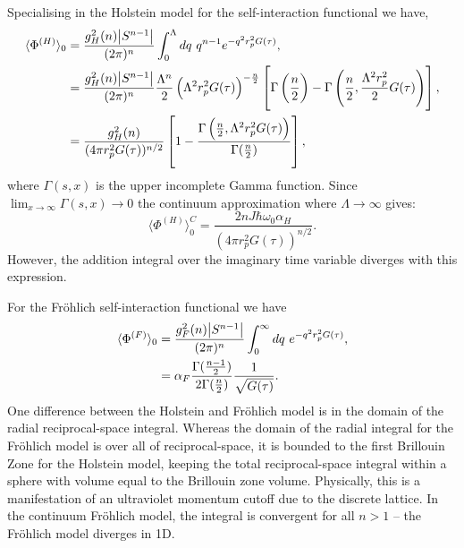 Specialising in the Holstein model for the self-interaction functional we have,
\begin{equation}
    \begin{aligned}
        \langle \Phi^{(H)} \rangle_0 &= \frac{g^2_H(n) \abs{S^{n-1}}}{(2\pi)^n} \int_0^{\Lambda} dq\ q^{n-1} e^{-q^2 r_p^2 G(\tau)} , \\
        &= \frac{g^2_H(n) \abs{S^{n-1}}}{(2\pi)^n} \frac{\Lambda^n}{2} \left(\Lambda^2 r_p^2 G(\tau) \right)^{-\frac{n}{2}} \left[ \Gamma\left(\frac{n}{2}\right) - \Gamma\left(\frac{n}{2}, \frac{\Lambda^2 r_p^2}{2} G(\tau) \right) \right], \\
        &= \frac{g_H^2(n)}{(4\pi r_p^2 G(\tau))^{n/2}} \left[1 - \frac{\Gamma\left(\frac{n}{2}, \Lambda^2 r_p^2 G(\tau) \right)}{\Gamma(\frac{n}{2})} \right], 
    \end{aligned}
\end{equation}
where $\Gamma(s, x)$ is the upper incomplete Gamma function. Since $\lim_{x\to\infty} \Gamma(s, x) \to 0$ the continuum approximation where $\Lambda \to \infty$ gives:
\begin{equation}
    \langle \Phi^{(H)} \rangle_0^C = \frac{2 n J \hbar \omega_0 \alpha_H}{(4\pi r^2_p G(\tau))^{n/2}}.
\end{equation}
However, the addition integral over the imaginary time variable diverges with this expression.

For the Fr\"ohlich self-interaction functional we have
\begin{equation}
    \begin{aligned}
        \langle\Phi^{(F)}\rangle_0 &= \frac{g^2_F(n) \abs{S^{n-1}}}{(2\pi)^n} \int_0^{\infty} dq\ e^{-q^2 r_p^2 G(\tau)} , \\
        &= \alpha_F \frac{\Gamma(\frac{n-1}{2})}{2 \Gamma(\frac{n}{2})} \frac{1}{\sqrt{G(\tau)}}.
    \end{aligned}
\end{equation}
One difference between the Holstein and Fr\"ohlich model is in the domain of the radial reciprocal-space integral. Whereas the domain of the radial integral for the Fr\"ohlich model is over all of reciprocal-space, it is bounded to the first Brillouin Zone for the Holstein model, keeping the total reciprocal-space integral within a sphere with volume equal to the Brillouin zone volume. Physically, this is a manifestation of an ultraviolet momentum cutoff due to the discrete lattice. In the continuum Fr\"ohlich model, the integral is convergent for all $n > 1$ – the Fr\"ohlich model diverges in 1D.

